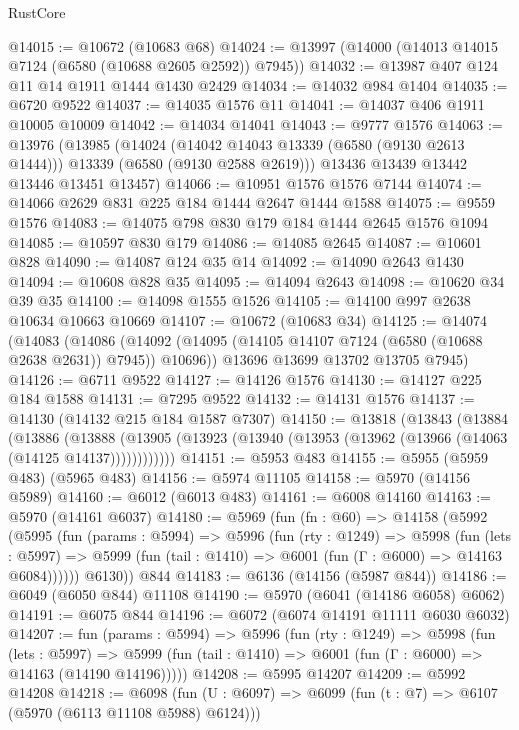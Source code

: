 \begin{lexlean}{RustCore}
\begin{coremodule}
{\begin{coremodule}
{{{{{{{{{{{{{{{{{{{{{{{{{{{{{{{{{{{{{{{{{{{{{@14015 := @10672 (@10683 @68)
@14024 := @13997 (@14000 (@14013 @14015 @7124 (@6580 (@10688 @2605 @2592)) @7945))
@14032 := @13987 @407 @124 @11 @14 @1911 @1444 @1430 @2429
@14034 := @14032 @984 @1404
@14035 := @6720 @9522
@14037 := @14035 @1576 @11
@14041 := @14037 @406 @1911 @10005 @10009
@14042 := @14034 @14041
@14043 := @9777 @1576
@14063 := @13976
    (@13985
      (@14024 (@14042 @14043 @13339 (@6580 (@9130 @2613 @1444))) @13339 (@6580 (@9130 @2588 @2619)))
      @13436
      @13439
      @13442
      @13446
      @13451
      @13457)
@14066 := @10951 @1576 @1576 @7144
@14074 := @14066 @2629 @831 @225 @184 @1444 @2647 @1444 @1588
@14075 := @9559 @1576
@14083 := @14075 @798 @830 @179 @184 @1444 @2645 @1576 @1094
@14085 := @10597 @830 @179
@14086 := @14085 @2645
@14087 := @10601 @828
@14090 := @14087 @124 @35 @14
@14092 := @14090 @2643 @1430
@14094 := @10608 @828 @35
@14095 := @14094 @2643
@14098 := @10620 @34 @39 @35
@14100 := @14098 @1555 @1526
@14105 := @14100 @997 @2638 @10634 @10663 @10669
@14107 := @10672 (@10683 @34)
@14125 := @14074
    (@14083
      (@14086 (@14092 (@14095 (@14105 @14107 @7124 (@6580 (@10688 @2638 @2631)) @7945)) @10696))
      @13696
      @13699
      @13702
      @13705
      @7945)
@14126 := @6711 @9522
@14127 := @14126 @1576
@14130 := @14127 @225 @184 @1588
@14131 := @7295 @9522
@14132 := @14131 @1576
@14137 := @14130 (@14132 @215 @184 @1587 @7307)
@14150 := @13818
    (@13843
      (@13884
        (@13886
          (@13888 (@13905 (@13923 (@13940 (@13953 (@13962 (@13966 (@14063 (@14125 @14137))))))))))))
@14151 := @5953 @483
@14155 := @5955 (@5959 @483) (@5965 @483)
@14156 := @5974 @11105
@14158 := @5970 (@14156 @5989)
@14160 := @6012 (@6013 @483)
@14161 := @6008 @14160
@14163 := @5970 (@14161 @6037)
@14180 := @5969
    (fun (fn : @60) =>
    @14158
      (@5992
        (@5995
          (fun (params : @5994) =>
          @5996
            (fun (rty : @1249) =>
            @5998
              (fun (lets : @5997) =>
              @5999 (fun (tail : @1410) => @6001 (fun (Γ : @6000) => @14163 @6084))))))
        @6130))
    @844
@14183 := @6136 (@14156 (@5987 @844))
@14186 := @6049 (@6050 @844) @11108
@14190 := @5970 (@6041 (@14186 @6058) @6062)
@14191 := @6075 @844
@14196 := @6072 (@6074 @14191 @11111 @6030 @6032)
@14207 := fun (params : @5994) =>
  @5996
    (fun (rty : @1249) =>
    @5998
      (fun (lets : @5997) =>
      @5999 (fun (tail : @1410) => @6001 (fun (Γ : @6000) => @14163 (@14190 @14196)))))
@14208 := @5995 @14207
@14209 := @5992 @14208
@14218 := @6098
    (fun (U : @6097) => @6099 (fun (t : @7) => @6107 (@5970 (@6113 @11108 @5988) @6124)))
}}}}}}}}}}}}}}}}}}}}}}}}}}}}}}}}}}}}}}}}}}}}}
\end{coremodule}}
\end{coremodule}
\end{lexlean}
